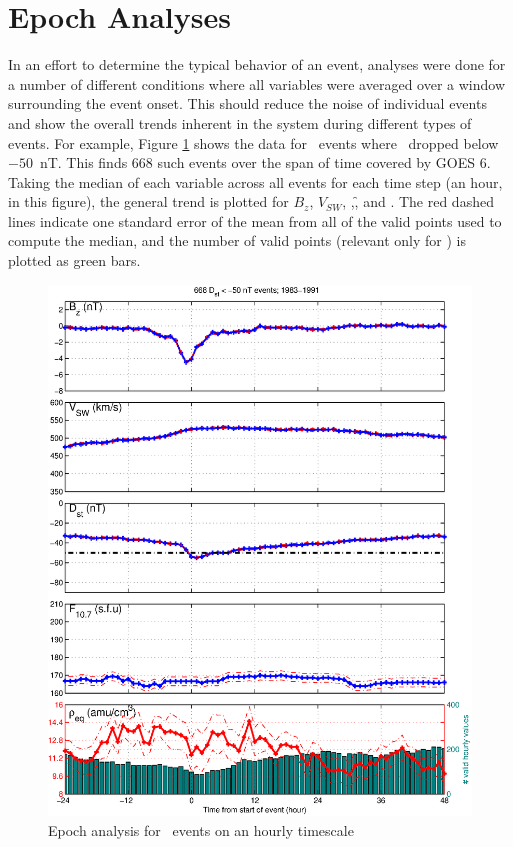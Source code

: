 \section{Epoch Analyses}
In an effort to determine the typical behavior of an event, analyses were done for a number of different conditions where all variables were averaged over a window surrounding the event onset. This should reduce the noise of individual events and show the overall trends inherent in the system during different types of events. For example, Figure \ref{fig:EpochDst} shows the data for \dst\ events where \dst\ dropped below $-50$~nT. This finds 668 such events over the span of time covered by GOES 6. Taking the median of each variable across all events for each time step (an hour, in this figure), the general trend is plotted for $B_z$, $V_{SW}$, \dst,\f, and \req. The red dashed lines indicate one standard error of the mean from all of the valid points used to compute the median, and the number of valid points (relevant only for \req) is plotted as green bars.

\begin{figure}[htp!]
	\centering
	\includegraphics[width=1\linewidth]{Figures/StormAvs/stormavs-dst}
	\caption{Epoch analysis for \dst\ events on an hourly timescale}
	\label{fig:EpochDst}
\end{figure}

